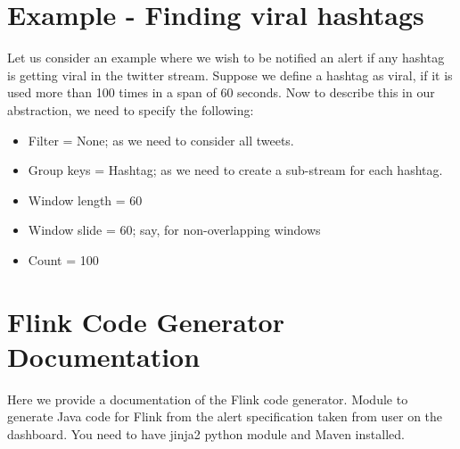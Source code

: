 \documentclass[letterpaper,10pt,english]{sphinxmanual}
\begin{document}
\section{Example - Finding viral hashtags}
\label{\detokenize{flink:example-finding-viral-hashtags}}
Let us consider an example where we wish to be notified an alert if any hashtag is getting viral in the twitter stream. Suppose we define a hashtag as viral, if it is used more than 100 times in a span of 60 seconds. Now to describe this in our abstraction, we need to specify the following:
\begin{itemize}
\item {} 
Filter = None; as we need to consider all tweets.

\item {} 
Group keys = Hashtag; as we need to create a sub-stream for each hashtag.

\item {} 
Window length = 60

\item {} 
Window slide = 60; say, for non-overlapping windows

\item {} 
Count = 100

\end{itemize}


\section{Flink Code Generator Documentation}
\label{\detokenize{flink:flink-code-generator-documentation}}
Here we provide a documentation of the Flink code generator.
\label{\detokenize{flink:module-flink_code_gen}}
Module to generate Java code for Flink from the alert specification taken from user on the dashboard. You need to have jinja2 python module and Maven installed.
\end{document}
